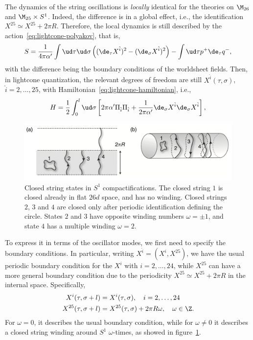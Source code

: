 The dynamics of the string oscillations is \emph{locally} identical for the theories on $\M_{26}$ and $\M_{25} \times S^1$. Indeed, the difference is in a global effect, i.e., the identification $X^{25} \simeq X^{25} + 2\pi R$. Therefore, the local dynamics is still described by the action~\eqref{eq:lightcone-polyakov}, that is,
\begin{equation}
    S = \frac{1}{4\pi\alpha'} \int \ud \tau \ud \sigma \left( (\de_\tau X^{\hat{i}})^2 - (\de_\sigma X^{\hat{i}})^2 \right) - \int \ud \tau p^+ \de_\tau q^-,
\end{equation}
with the difference being the boundary conditions of the worldsheet fields. Then, in lightcone quantization, the relevant degrees of freedom are still $X^{\hat{i}}(\tau,\sigma)$, $\hat{i} = 2, \dots, 25$, with Hamiltonian~\eqref{eq:lightcone-hamiltonian}, i.e.,
\begin{equation}
    H = \frac{1}{2} \int_0^l \ud \sigma \left[ 2\pi\alpha' \Pi_{\hat{i}} \Pi_{\hat{i}} + \frac{1}{2\pi\alpha'} \de_\sigma X^{\hat{i}} \de_\sigma X^{\hat{i}} \right],
\end{equation}

\begin{figure}
    \centering
    \includegraphics[width=\textwidth]{figures/winding.png}
    \caption{Closed string states in $S^1$ compactifications. The closed string $1$ is closed already in flat $26d$ space, and has no winding. Closed strings $2$, $3$ and $4$ are closed only after periodic identification defining the circle. States $2$ and $3$ have opposite winding numbers $\omega = \pm 1$, and state $4$ has a multiple winding $\omega = 2$.}
    \label{fig:winding}
\end{figure}

To express it in terms of the oscillator modes, we first need to specify the boundary conditions. In particular, writing $X^{\hat{i}} = (X^i, X^{25})$, we have the usual periodic boundary condition for the $X^i$ with $i = 2, \dots, 24$, while $X^{25}$ can have a more general boundary condition due to the periodicity $X^{25}\simeq X^{25} + 2\pi R$ in the internal space. Specifically,
\begin{subequations}
\begin{align}
    X^i(\tau,\sigma + l) &= X^i(\tau,\sigma), \quad i = 2, \dots, 24\\
    X^{25}(\tau,\sigma + l) &= X^{25}(\tau,\sigma) + 2\pi R \omega, \quad \omega \in \Z.
\end{align}
\end{subequations}
For $\omega = 0$, it describes the usual boundary condition, while for $\omega \neq 0$ it describes a closed string winding around $S^1$ $\omega$-times, as showed in figure~\ref{fig:winding}.

